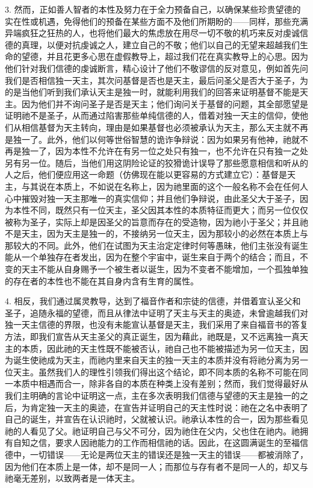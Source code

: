 3. 然而，正如善人智者的本性及努力在于全力预备自己，以确保某些珍贵望德的实在性或机遇，免得他们的预备在某些方面不及他们所期盼的——同样，那些充满异端疯狂之狂热的人，也将他们最大的焦虑放在用尽一切不敬的机巧来反对虔诚信德的真理，以便对抗虔诚之人，建立自己的不敬；他们以自己的无望来超越我们生命的望德，并且花更多心思在虚假教导上，超过我们花在真实教导上的心思。因为他们针对我们信德的虔诚断言，精心设计了他们不敬谬信的反对意见，例如首先问我们是否相信独一天主，其次问基督是否也是天主，最后问圣父是否大于圣子，为的是当他们听到我们承认天主是独一时，就能利用我们的回答来证明基督不能是天主。因为他们并不询问圣子是否是天主；他们询问关于基督的问题，其全部愿望是证明祂不是圣子，从而通过陷害那些单纯信德的人，借着对独一天主的信仰，使他们从相信基督为天主转向，理由是如果基督也必须被承认为天主，那么天主就不再是独一了。此外，他们以何等世俗智慧的诡诈争辩说：因为如果另有他神，祂就不再是独一了，因为本性不允许在有另一位之处只有独一，也不允许在只有独一之处另有另一位。随后，当他们用这阴险论证的狡猾诡计误导了那些愿意相信和听从的人之后，他们便应用这一命题（仿佛现在能以更容易的方式建立它）：基督是天主，与其说在本质上，不如说在名称上，因为祂里面的这个一般名称不会在任何人心中摧毁对独一天主那唯一的真实信仰；并且他们争辩说，由此圣父大于圣子，因为本性不同，既然只有一位天主，圣父因其本性的本质特征而更大；而另一位仅仅被称为圣子，实际上却是因圣父的旨意而存在的受造物，因为祂小于圣父；并且祂不是天主，因为天主是独一的，不接纳另一位天主，因为那较小的必然在本质上与那较大的不同。此外，他们在试图为天主治定定律时何等愚昧，他们主张没有诞生能从一个单独存在者发出，因为在整个宇宙中，诞生来自于两个的结合；而且，不变的天主不能从自身赐予一个被生者以诞生，因为不变者不能增加，一个孤独单独的存在者的本性也不能在其自身内含有生育的属性。\par

4. 相反，我们通过属灵教导，达到了福音作者和宗徒的信德，并借着宣认圣父和圣子，追随永福的望德，而且从律法中证明了天主与天主的奥迹，未曾逾越我们对独一天主信德的界限，也没有未能宣认基督是天主，我们采用了来自福音书的答复方法，即我们宣告从天主圣父的真正诞生，因为藉此，祂既是，又不远离独一真天主的本质，因此祂的天主性既不能被否认，祂自己也不能被描述为另一位天主，因为诞生使祂成为天主，而祂内里来自天主的独一天主的本质并没有将祂分离为另一位天主。虽然我们人的理性引领我们得出这个结论，即不同本质的名称不可能在同一本质中相遇而合一，除非各自的本质在种类上没有差别；然而，我们觉得最好从我们主明确的言论中证明这一点，主在多次表明我们信德与望德的天主是独一的之后，为肯定独一天主的奥迹，在宣告并证明自己的天主性时说：祂在之名中表明了自己的诞生，并宣告在认识祂时，父就被认识。祂承认本性的合一，因为那些看见祂的人看见了父。祂证明自己与父不可分，因为祂住在父内，父也住在祂内。祂拥有自知之信，要求人因祂能力的工作而相信祂的话。因此，在这圆满诞生的至福信德中，一切错误——无论是两位天主的错误还是独一天主的错误——都被消除了，因为他们在本质上是一体，却不是同一人；而那位与存有者不是同一人的，却又与祂毫无差别，以致两者是一体天主。\par

